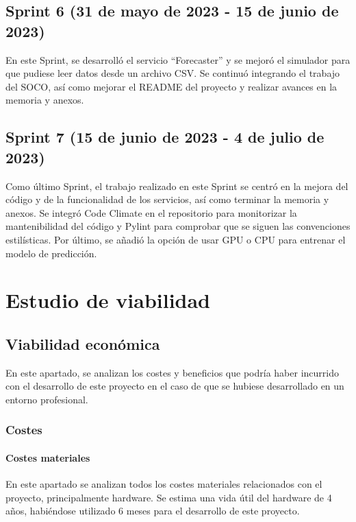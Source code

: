 
\subsection{Sprint 6 (31 de mayo de 2023 - 15 de junio de 2023)}

En este Sprint, se desarrolló el servicio ``Forecaster'' y se mejoró el simulador para que pudiese leer datos 
desde un archivo CSV. Se continuó integrando el trabajo del SOCO, así como mejorar el README del proyecto y realizar 
avances en la memoria y anexos.


\subsection{Sprint 7 (15 de junio de 2023 - 4 de julio de 2023)}

Como último Sprint, el trabajo realizado en este Sprint se centró en la mejora del código y de la funcionalidad 
de los servicios, así como terminar la memoria y anexos. Se integró Code Climate en el repositorio para monitorizar 
la mantenibilidad del código y Pylint para comprobar que se siguen las convenciones estilísticas. Por último, se 
añadió la opción de usar GPU o CPU para entrenar el modelo de predicción.


\section{Estudio de viabilidad}

\subsection{Viabilidad económica}

En este apartado, se analizan los costes y beneficios que podría haber incurrido con el desarrollo 
de este proyecto en el caso de que se hubiese desarrollado en un entorno profesional.

\subsubsection{Costes}

\paragraph{Costes materiales}
En este apartado se analizan todos los costes materiales relacionados con el proyecto, principalmente 
hardware. Se estima una vida útil del hardware de 4 años, habiéndose utilizado 6 meses para 
el desarrollo de este proyecto.

